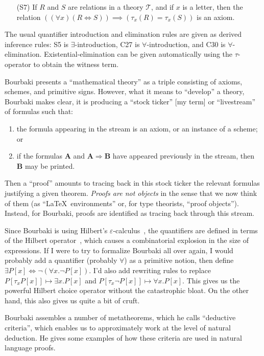 \begin{node}
\begin{itemize}
\item[(S7)] If $R$ and $S$ are relations in a theory $\mathcal{T}$,
  and if $x$ is a letter, then the relation $((\forall x)(R\iff S))\implies(\tau_{x}(R)=\tau_{x}(S))$
  is an axiom.
\end{itemize}
The usual quantifier introduction and elimination rules are given as
derived inference rules: S5 is $\exists$-introduction,
C27 is $\forall$-introduction, and
C30 is $\forall$-elimination. Existential-elimination can be given
automatically using the $\tau$-operator to obtain the witness term.
\begin{node}[Proofs]\label{bourbaki-000K}%
Bourbaki presents a ``mathematical theory'' as a triple consisting of
axioms, schemes, and primitive signs. However, what it means to
``develop'' a theory, Bourbaki makes clear, it is producing a ``stock
ticker'' [my term] or ``livestream'' of formulas such that:
\begin{enumerate}
\item the formula appearing in the stream is an axiom, or an instance of
  a scheme; or
\item if the formulas $\boldsymbol{A}$ and $\boldsymbol{A}\Longrightarrow\boldsymbol{B}$
  have appeared previously in the stream, then $\boldsymbol{B}$ may be
  printed. 
\end{enumerate}
Then a ``proof'' amounts to tracing back in this stock ticker the
relevant formulas justifying a given theorem. \emph{Proofs are not objects}
in the sense that we now think of them (as ``\LaTeX\ environments'' or,
for type theorists, ``proof objects''). Instead, for Bourbaki, proofs
are identified as tracing back through this stream.
\end{node}

\begin{node}[Quantifiers]\label{bourbaki-000E}%
Since Bourbaki is using Hilbert's
$\varepsilon$-calculus~, the quantifiers are
defined in terms of the Hilbert operator~, which
causes a combinatorial explosion in the size of expressions. If I were
to try to formalize Bourbaki all over again, I would probably add a
quantifier (probably $\forall$) as a primitive notion, then define
$\exists P[x]\iff\neg(\forall x.\neg P[x])$. I'd also add rewriting
rules to replace $P[\tau_{x}P[x]]\mapsto\exists x.P[x]$ and
$P[\tau_{x}\neg P[x]]\mapsto\forall x.P[x]$. This gives us the powerful
Hilbert choice operator without the catastrophic bloat. On the other
hand, this also gives us quite a bit of cruft.
\end{node}

\begin{node}\label{bourbaki-000J}%
Bourbaki assembles a number of metatheorems, which he calls ``deductive
criteria'', which enables us to approximately work at the level of
natural deduction. He gives some examples of how these criteria are used
in natural language proofs.
\end{node}
\end{node}


